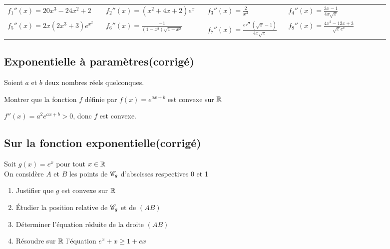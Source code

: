 \documentclass[oneside,12pt]{book}          %
\begin{document}
\begin{sol}
	\begin{tabular}{p{0.23\linewidth}p{0.23\linewidth}p{0.18\linewidth}p{0.25\linewidth}}
		$f_1''(x)=20x^3-24x^2+2$ & $f_2''(x)=(x^2+4x+2)e^x$ & $f_3''(x)=\frac{2}{x^3}$ & $f_4''(x)=\frac{3x-1}{4x\sqrt{x}}$\\
		$f_5''(x)=2x(2x^3+3)e^{x^2}$ & $f_6''(x)=\frac{-1}{(1-x^2)\sqrt{1-x^2}}$ & $f_7''(x)=\frac{e^{\sqrt{x}}(\sqrt{x}-1)}{4x\sqrt{x}}$ & $f_8''(x)=\frac{4x^2-12x+3}{\sqrt{x}e^x}$
	\end{tabular}
\end{sol}



\subsection{Exponentielle à paramètres\quad\small{(corrigé)}}
Soient $a$ et $b$ deux nombres réels quelconques.

Montrer que la fonction $f$ définie par $f(x)=e^{ax+b}$ est convexe sur ${\mathbb R}$

\begin{sol}
	$f''(x)=a^2e^{ax+b} > 0$, donc $f$ est convexe.\\
\end{sol}



\subsection{Sur la fonction exponentielle\quad\small{(corrigé)}}
Soit $g(x)=e^x$ pour tout ${x\in\mathbb R}$\\
On considère $A$ et $B$ les points de ${\mathscr{C}}_g$ d'abscisses respectives 0 et 1
\begin{enumerate}
	\item Justifier que $g$ est convexe sur ${\mathbb R}$
    \item Étudier la position relative de ${\mathscr{C}}_g$ et de $(AB)$
    \item Déterminer l'équation réduite de la droite $(AB)$
    \item Résoudre sur ${\mathbb R}$ l'équation $e^x+x\geq1+ex$
\end{enumerate}
\end{document}
